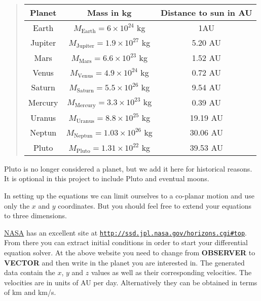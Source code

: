 \documentclass[%
oneside,                 %
final,                   %
10pt]{article}
\begin{document}
\begin{quote}
\begin{tabular}{ccc}
\hline
\multicolumn{1}{c}{ Planet } & \multicolumn{1}{c}{ Mass in kg } & \multicolumn{1}{c}{ Distance to  sun in AU } \\
\hline
Earth   & $M_{\mathrm{Earth}}=6\times 10^{24}$ kg     & 1AU                    \\
Jupiter & $M_{\mathrm{Jupiter}}=1.9\times 10^{27}$ kg & 5.20 AU                \\
Mars    & $M_{\mathrm{Mars}}=6.6\times 10^{23}$ kg    & 1.52 AU                \\
Venus   & $M_{\mathrm{Venus}}=4.9\times 10^{24}$ kg   & 0.72 AU                \\
Saturn  & $M_{\mathrm{Saturn}}=5.5\times 10^{26}$ kg  & 9.54 AU                \\
Mercury & $M_{\mathrm{Mercury}}=3.3\times 10^{23}$ kg & 0.39 AU                \\
Uranus  & $M_{\mathrm{Uranus}}=8.8\times 10^{25}$ kg  & 19.19 AU               \\
Neptun  & $M_{\mathrm{Neptun}}=1.03\times 10^{26}$ kg & 30.06 AU               \\
Pluto   & $M_{\mathrm{Pluto}}=1.31\times 10^{22}$ kg  & 39.53 AU               \\
\hline
\end{tabular}
\end{quote}

\noindent
Pluto is no longer considered  a planet, but we add it here for historical reasons. It is optional in this project to include Pluto and eventual moons. 

In setting up the equations we can limit ourselves to a co-planar motion and use only the $x$ and $y$ coordinates. But you should feel free to extend your equations to three dimensions.

\href{{http://www.nasa.gov/index.html}}{NASA} has an excellent site at \href{{http://ssd.jpl.nasa.gov/horizons.cgi#top}}{\nolinkurl{http://ssd.jpl.nasa.gov/horizons.cgi\#top}}.
From there you can extract initial conditions in order to start your differential equation solver.
At the above website you need to change from \textbf{OBSERVER} to \textbf{VECTOR} and then write in the planet you are interested in.
The generated data contain the $x$, $y$ and $z$ values as well as their corresponding velocities. The velocities are in units of AU per day.
Alternatively they can be obtained in terms of km and km/s. 
\end{document}
